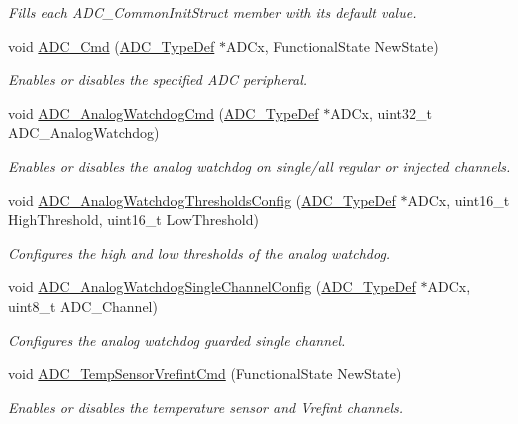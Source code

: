 \begin{DoxyCompactItemize}
\begin{DoxyCompactList}\small\item\em Fills each A\+D\+C\+\_\+\+Common\+Init\+Struct member with its default value. \end{DoxyCompactList}\item 
void \hyperlink{group___a_d_c_ga40882d399e3371755ed610c1134e634e}{A\+D\+C\+\_\+\+Cmd} (\hyperlink{struct_a_d_c___type_def}{A\+D\+C\+\_\+\+Type\+Def} $\ast$A\+D\+Cx, Functional\+State New\+State)
\begin{DoxyCompactList}\small\item\em Enables or disables the specified A\+DC peripheral. \end{DoxyCompactList}\item 
void \hyperlink{group___a_d_c_gad017d69bec6e497afd35ba25ea22d86e}{A\+D\+C\+\_\+\+Analog\+Watchdog\+Cmd} (\hyperlink{struct_a_d_c___type_def}{A\+D\+C\+\_\+\+Type\+Def} $\ast$A\+D\+Cx, uint32\+\_\+t A\+D\+C\+\_\+\+Analog\+Watchdog)
\begin{DoxyCompactList}\small\item\em Enables or disables the analog watchdog on single/all regular or injected channels. \end{DoxyCompactList}\item 
void \hyperlink{group___a_d_c_ga79588d02aa8e4147f21cb90a4708366d}{A\+D\+C\+\_\+\+Analog\+Watchdog\+Thresholds\+Config} (\hyperlink{struct_a_d_c___type_def}{A\+D\+C\+\_\+\+Type\+Def} $\ast$A\+D\+Cx, uint16\+\_\+t High\+Threshold, uint16\+\_\+t Low\+Threshold)
\begin{DoxyCompactList}\small\item\em Configures the high and low thresholds of the analog watchdog. \end{DoxyCompactList}\item 
void \hyperlink{group___a_d_c_ga03cef3d12292ffa2b8520524d5b0226c}{A\+D\+C\+\_\+\+Analog\+Watchdog\+Single\+Channel\+Config} (\hyperlink{struct_a_d_c___type_def}{A\+D\+C\+\_\+\+Type\+Def} $\ast$A\+D\+Cx, uint8\+\_\+t A\+D\+C\+\_\+\+Channel)
\begin{DoxyCompactList}\small\item\em Configures the analog watchdog guarded single channel. \end{DoxyCompactList}\item 
void \hyperlink{group___a_d_c_ga848682e2d7d3de9f8cf03ffa4c11f0b5}{A\+D\+C\+\_\+\+Temp\+Sensor\+Vrefint\+Cmd} (Functional\+State New\+State)
\begin{DoxyCompactList}\small\item\em Enables or disables the temperature sensor and Vrefint channels. \end{DoxyCompactList}\item 

\end{DoxyCompactItemize}
